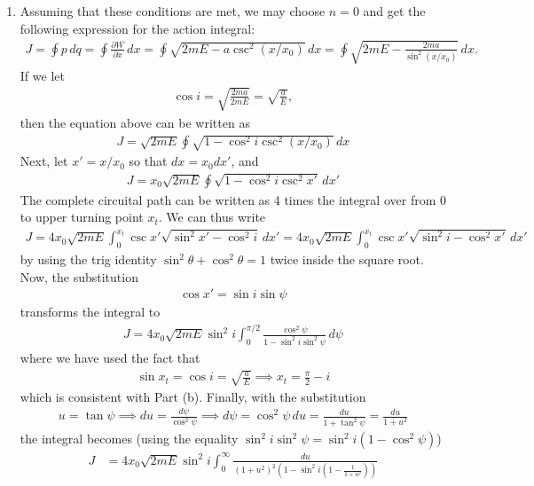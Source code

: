 \documentclass{article}
\theoremstyle{definition}
\newcommand{\p}{\partial}
\newcommand{\f}[2]{\frac{#1}{#2}}
\newcommand{\lp}{\left(}
\newcommand{\rp}{\right)}
\begin{document}
\begin{enumerate}[label=(\alph*)]
	
	\item Assuming that these conditions are met, we may choose $n=0$ and get the following expression for the action integral:
	\begin{align*}
	J = \oint p\,dq = \oint \f{\p W}{\p x}\,dx = \oint \sqrt{2mE - a\csc^2(x/x_0)}\,dx = \oint \sqrt{2mE - \f{2ma}{\sin^2(x/x_0)}}\,dx.
	\end{align*}
	If we let
	\begin{align*}
	\cos i = \sqrt{\f{2ma}{2mE}} = \sqrt{\f{a}{E}},
	\end{align*}
	then the equation above can be written as
	\begin{align*}
	J = \sqrt{2mE}\oint \sqrt{1- \cos^2 i \csc^2(x/x_0)}\,dx
	\end{align*}
	Next, let $x' = x/x_0$ so that $dx = x_0 dx'$, and
	\begin{align*}
	J = x_0\sqrt{2mE}\oint \sqrt{1- \cos^2 i \csc^2 x'}\,dx'
	\end{align*}
	The complete circuital path can be written as 4 times the integral over from $0$ to upper turning point $x_t$. We can thus write
	\begin{align*}
	J = 4x_0\sqrt{2mE}\int_0^{x_t} \csc x' \sqrt{\sin^2 x' - \cos^2 i }\,dx'  = 4x_0\sqrt{2mE}\int_0^{x_t} \csc x' \sqrt{\sin^2 i - \cos^2 x' }\,dx'
	\end{align*}
	by using the trig identity $\sin^2\theta + \cos^2\theta = 1$ twice inside the square root. Now, the substitution 
	\begin{align*}
	\cos x' = \sin i \sin\psi
	\end{align*}
	transforms the integral to 
	\begin{align*}
	J = 4x_0\sqrt{2mE}\sin^2 i \int_0^{\pi/2} \f{\cos^2\psi }{1-\sin^2 i \sin^2\psi}   \,d\psi
	\end{align*}
	where we have used the fact that 
	\begin{align*}
	\sin x_t = \cos i = \sqrt{\f{a}{E}}\implies x_t = \f{\pi}{2} - i
	\end{align*}
	which is consistent with Part (b). Finally, with the substitution
	\begin{align*}
	u = \tan\psi \implies du = \f{d\psi}{\cos^2\psi} \implies d\psi = \cos^2\psi \,du = \f{du}{1+\tan^2\psi} = \f{du}{1+u^2}
	\end{align*}
	the integral becomes (using the equality $\sin^2 i \sin^2\psi = \sin^2 i (1-\cos^2\psi)$)
	\begin{align*}
	J &= 4x_0 \sqrt{2mE} \sin^2 i \int_0^\infty \f{du}{(1+u^2)^2\lp 1-\sin^2 i \lp 1- \f{1}{1+u^2}\rp\rp}\\

\end{align*}
\end{enumerate}
\end{document}
